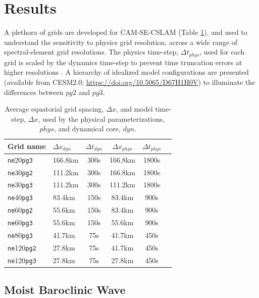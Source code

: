 \documentclass{agujournal}
\begin{document}


\section{Results}

A plethora of grids are developed for CAM-SE-CSLAM (Table \ref{table:grids}), and used to understand the sensitivity to physics grid resolution, across a wide range of spectral-element grid resolutions. The physics time-step, $\Delta t_{phys}$, used for each grid is scaled by the dynamics time-step to prevent time truncation errors at higher resolutions \citep{HR2018JAMES}. A hierarchy of idealized model configurations are presented (available from CESM2.0; \url{https://doi.org/10.5065/D67H1H0V}) to illuminate the differences between $pg2$ and $pg3$.

 \begin{table}
 \caption{Average equatorial grid spacing, $\Delta x$, and model time-step, $\Delta x$, used by the physical parameterizations, $phys$, and dynamical core, $dyn$.}
 \centering
 \begin{tabular}{llcccc}
 \hline
 Grid name & $\Delta x_{dyn}$  & $\Delta t_{dyn}$ & $\Delta x_{phys}$  & $\Delta t_{phys}$ \\
 \hline
   {\tt{ne}}20{\tt{pg3}}  & 166.8km & 300s  & 166.8km & 1800s \\
   {\tt{ne}}30{\tt{pg2}}  & 111.2km & 300s  & 166.8km & 1800s \\
   {\tt{ne}}30{\tt{pg3}}  & 111.2km & 300s  & 111.2km & 1800s \\
   {\tt{ne}}40{\tt{pg3}}  &  83.4km & 150s  &  83.4km &  900s \\
   {\tt{ne}}60{\tt{pg2}}  &  55.6km & 150s  &  83.4km &  900s \\
   {\tt{ne}}60{\tt{pg3}}  &  55.6km & 150s  &  55.6km &  900s \\
   {\tt{ne}}80{\tt{pg3}}  &  41.7km &  75s  &  41.7km &  450s \\
   {\tt{ne}}120{\tt{pg2}} &  27.8km &  75s  &  41.7km &  450s \\
   {\tt{ne}}120{\tt{pg3}} &  27.8km &  75s  &  27.8km &  450s \\
 \hline
 \end{tabular}
 \label{table:grids}
 \end{table}

\subsection{Moist Baroclinic Wave}
\end{document}
